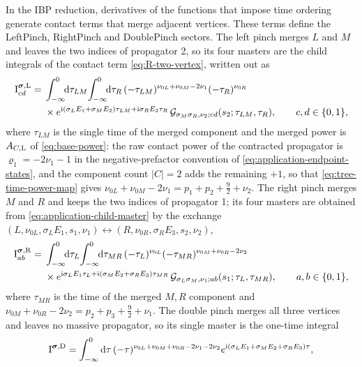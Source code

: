 \documentclass[11pt,a4paper]{article}
\newcommand{\dd}{\mathrm d}
\newcommand{\ii}{\mathrm i}
\begin{document}
In the IBP reduction, derivatives of the functions that impose time ordering generate
contact terms that merge adjacent vertices. These terms define the
LeftPinch, RightPinch and DoublePinch sectors.
The left pinch merges $L$ and $M$ and leaves the two indices of propagator 2, so its four masters
are the child integrals of the contact term \eqref{eq:R-two-vertex}, written out as
\begin{equation}
 \begin{aligned}
 \text{I}^{\boldsymbol\sigma,{\rm L}}_{cd}
 ={}&\int_{-\infty}^{0}\!\!\dd\tau_{LM}\!\int_{-\infty}^{0}\!\!\dd\tau_R\,
 (-\tau_{LM})^{\nu_{0L}+\nu_{0M}-2\nu_1}(-\tau_R)^{\nu_{0R}}\\
 &\times e^{\ii(\sigma_LE_1+\sigma_ME_2)\tau_{LM}+\ii\sigma_RE_3\tau_R}\,
 \mathcal G_{\sigma_M\sigma_R,\nu_2;cd}(s_2;\tau_{LM},\tau_R),
 \qquad c,d\in\{0,1\},
 \end{aligned}
 \label{eq:application-child-master}
\end{equation}
where $\tau_{LM}$ is the single time of the merged component and the merged power is
$A_{C,{\rm L}}$ of \eqref{eq:base-power}: the raw contact power of the contracted propagator is
$\varrho_1=-2\nu_1-1$ in the negative-prefactor convention of
\eqref{eq:application-endpoint-states}, and the component count $|C|=2$ adds the remaining $+1$, so
that \eqref{eq:tree-time-power-map} gives $\nu_{0L}+\nu_{0M}-2\nu_1=p_1+p_2+\tfrac92+\nu_2$.
The right pinch merges $M$ and $R$ and keeps the two indices of propagator 1; its four masters
are obtained from \eqref{eq:application-child-master} by the exchange
$(L,\nu_{0L},\sigma_LE_1,s_1,\nu_1)\leftrightarrow(R,\nu_{0R},\sigma_RE_3,s_2,\nu_2)$,
\begin{equation}
 \begin{aligned}
 \text{I}^{\boldsymbol\sigma,{\rm R}}_{ab}
 ={}&\int_{-\infty}^{0}\!\!\dd\tau_L\!\int_{-\infty}^{0}\!\!\dd\tau_{MR}\,
 (-\tau_L)^{\nu_{0L}}(-\tau_{MR})^{\nu_{0M}+\nu_{0R}-2\nu_2}\\
 &\times e^{\ii\sigma_LE_1\tau_L+\ii(\sigma_ME_2+\sigma_RE_3)\tau_{MR}}\,
 \mathcal G_{\sigma_L\sigma_M,\nu_1;ab}(s_1;\tau_L,\tau_{MR}),
 \qquad a,b\in\{0,1\},
 \end{aligned}
 \label{eq:application-right-master}
\end{equation}
where $\tau_{MR}$ is the time of the merged $M,R$ component and
$\nu_{0M}+\nu_{0R}-2\nu_2=p_2+p_3+\tfrac92+\nu_1$.
The double pinch merges all three vertices and leaves no massive propagator, so its single
master is the one-time integral
\begin{equation}
 \text{I}^{\boldsymbol\sigma,{\rm D}}
 =\int_{-\infty}^{0}\dd\tau\,
 (-\tau)^{\nu_{0L}+\nu_{0M}+\nu_{0R}-2\nu_1-2\nu_2}
 e^{\ii(\sigma_LE_1+\sigma_ME_2+\sigma_RE_3)\tau},
 \label{eq:application-double-master}
\end{equation}
\end{document}
